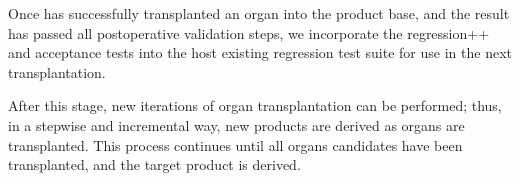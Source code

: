 Once \autoscalpel has successfully transplanted an organ into the product base, and the result has passed all postoperative validation steps, we incorporate the regression++ and acceptance tests into the host existing regression test suite for use in the next transplantation.

After this stage, new iterations of organ transplantation can be performed; thus, in a stepwise and incremental way, new products are derived as organs are transplanted. This process continues until all organs candidates have been transplanted, and the target product is derived. 
